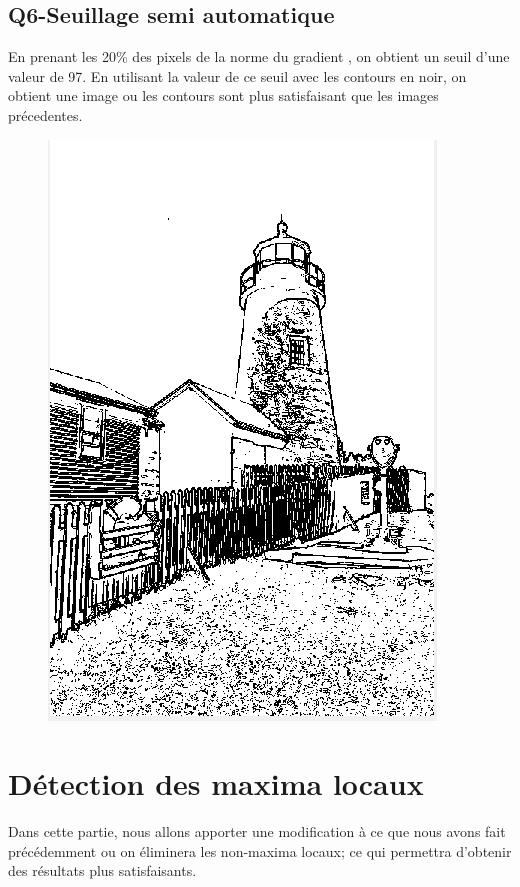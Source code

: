 \documentclass[a4paper,12pt]{report}
\begin{document}
\subsection*{Q6-Seuillage semi automatique}
En prenant les 20\% des pixels de la norme du gradient , on obtient un seuil d'une valeur de 97. En utilisant la valeur de ce seuil avec les contours en noir, on obtient une image ou les contours sont plus satisfaisant que les images précedentes.
\begin{figure}[!ht]
	\center
	\includegraphics[scale=0.4]{./imageResultats/norme_gradient_q6.png}
\end{figure}
\section*{Détection des maxima locaux}
Dans cette partie, nous allons apporter une modification à ce que nous avons fait précédemment ou on éliminera les non-maxima locaux; ce qui permettra d'obtenir des résultats plus satisfaisants.
\end{document}
